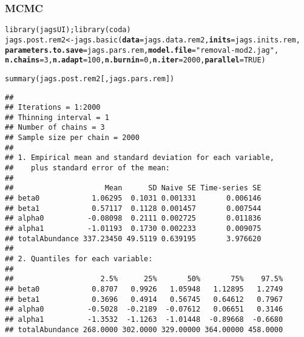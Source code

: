 \documentclass[color=usenames,dvipsnames]{beamer}\usepackage[]{graphicx}\usepackage[]{xcolor}
\makeatletter
\newcommand{\hlnum}[1]{\textcolor[rgb]{0.69,0.494,0}{#1}}%
\newcommand{\hlstr}[1]{\textcolor[rgb]{0.749,0.012,0.012}{#1}}%
\newcommand{\hlstd}[1]{\textcolor[rgb]{0,0,0}{#1}}%
\newcommand{\hlkwb}[1]{\textcolor[rgb]{0,0.341,0.682}{#1}}%
\newcommand{\hlkwc}[1]{\textcolor[rgb]{0,0,0}{\textbf{#1}}}%
\newcommand{\hlkwd}[1]{\textcolor[rgb]{0.004,0.004,0.506}{#1}}%
\newenvironment{kframe}{%
 \def\at@end@of@kframe{}%
 \ifinner\ifhmode%
  \def\at@end@of@kframe{\end{minipage}}%
  \begin{minipage}{\columnwidth}%
 \fi\fi%
 \def\FrameCommand##1{\hskip\@totalleftmargin \hskip-\fboxsep
 \colorbox{shadecolor}{##1}\hskip-\fboxsep
     \hskip-\linewidth \hskip-\@totalleftmargin \hskip\columnwidth}%
 \MakeFramed {\advance\hsize-\width
   \@totalleftmargin\z@ \linewidth\hsize
   \@setminipage}}%
 {\par\unskip\endMakeFramed%
 \at@end@of@kframe}
\newenvironment{knitrout}{}{} %
\makeatother
\begin{document}
\begin{frame}[fragile]
  \frametitle{MCMC}
  \small
\begin{knitrout}\tiny
{}\color{fgcolor}\begin{kframe}
\begin{alltt}
\hlkwd{library}\hlstd{(jagsUI);} \hlkwd{library}\hlstd{(coda)}
\hlstd{jags.post.rem2} \hlkwb{<-} \hlkwd{jags.basic}\hlstd{(}\hlkwc{data}\hlstd{=jags.data.rem2,} \hlkwc{inits}\hlstd{=jags.inits.rem,}
                             \hlkwc{parameters.to.save}\hlstd{=jags.pars.rem,} \hlkwc{model.file}\hlstd{=}\hlstr{"removal-mod2.jag"}\hlstd{,}
                             \hlkwc{n.chains}\hlstd{=}\hlnum{3}\hlstd{,} \hlkwc{n.adapt}\hlstd{=}\hlnum{100}\hlstd{,} \hlkwc{n.burnin}\hlstd{=}\hlnum{0}\hlstd{,} \hlkwc{n.iter}\hlstd{=}\hlnum{2000}\hlstd{,} \hlkwc{parallel}\hlstd{=}\hlnum{TRUE}\hlstd{)}
\end{alltt}
\end{kframe}
\end{knitrout}

\pause

\begin{knitrout}\tiny
{}\color{fgcolor}\begin{kframe}
\begin{alltt}
\hlkwd{summary}\hlstd{(jags.post.rem2[,jags.pars.rem])}
\end{alltt}
\begin{verbatim}
## 
## Iterations = 1:2000
## Thinning interval = 1 
## Number of chains = 3 
## Sample size per chain = 2000 
## 
## 1. Empirical mean and standard deviation for each variable,
##    plus standard error of the mean:
## 
##                     Mean      SD Naive SE Time-series SE
## beta0            1.06295  0.1031 0.001331       0.006146
## beta1            0.57117  0.1128 0.001457       0.007544
## alpha0          -0.08098  0.2111 0.002725       0.011836
## alpha1          -1.01193  0.1730 0.002233       0.009075
## totalAbundance 337.23450 49.5119 0.639195       3.976620
## 
## 2. Quantiles for each variable:
## 
##                    2.5%      25%       50%       75%    97.5%
## beta0            0.8707   0.9926   1.05948   1.12895   1.2749
## beta1            0.3696   0.4914   0.56745   0.64612   0.7967
## alpha0          -0.5028  -0.2189  -0.07612   0.06651   0.3146
## alpha1          -1.3532  -1.1263  -1.01448  -0.89668  -0.6680
## totalAbundance 268.0000 302.0000 329.00000 364.00000 458.0000
\end{verbatim}
\end{kframe}
\end{knitrout}
\end{frame}
\end{document}
